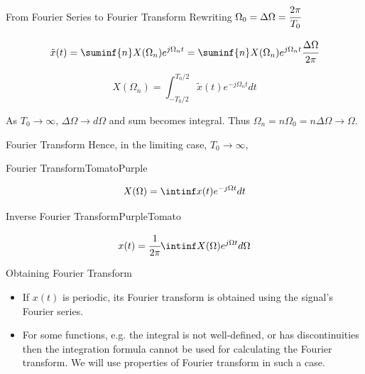 \documentclass[aspectratio=169,xcolor=dvipsnames,svgnames,x11names,fleqn]{beamer}
\begin{document}
\begin{frame}{From Fourier Series to Fourier Transform}
    Rewriting $\Omega_0 = \Delta \Omega = \cfrac{2\pi}{T_0}$

    $$
\tilde{x} (t) = \suminf{n} X(\Omega_n) e^{j\Omega_n t} = \suminf{n} X(\Omega_n)e^{j\Omega_n t}\cfrac{\Delta \Omega}{2\pi}
$$

$$
X(\Omega_n) =  \int_{-T_0/2}^{T_0/2} \tilde{x} (t)e^{-j\Omega_n t}dt
$$

As $T_0\to \infty$, $\Delta \Omega \to d\Omega$ and sum becomes integral. Thus $\Omega_n = n\Omega_0 = n\Delta \Omega \to \Omega$.

\end{frame}


\begin{frame}{Fourier Transform}
Hence, in the limiting case, $T_0 \to \infty$,

\begin{custombox}{Fourier Transform}{Tomato}{Purple}

$$
X(\Omega) = \intinf x(t) e^{-j \Omega t} dt
$$
\end{custombox}

    \begin{custombox}{Inverse Fourier Transform}{Purple}{Tomato}

$$
x(t) = \cfrac{1}{2\pi}\intinf X(\Omega) e^{j \Omega t} d\Omega
$$
\end{custombox}

    
\end{frame}

\begin{frame}{Obtaining Fourier Transform}
    \begin{itemize}
    
\item If $x(t)$ is periodic, its Fourier transform is obtained using the signal's Fourier series.
 \item For some functions, e.g. the integral is not well-defined, or has discontinuities then the integration formula cannot be used for calculating the Fourier transform. We will use properties of Fourier transform in such a case.
    \end{itemize}
\end{frame}
\end{document}
